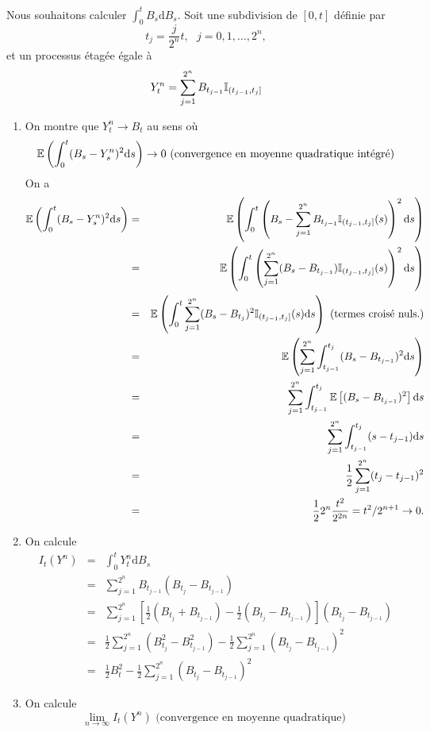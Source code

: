 \begin{ex}
Nous souhaitons calculer $\int_0^t B_s\text{d}B_s$. Soit une subdivision de $[0,t]$ définie par 
$$
t_j = \frac{j}{2^n}t,\text{ }j =0, 1,\ldots, 2^n,
$$
et un processus étagée égale à 
$$
Y_t^n = \sum_{j = 1}^{2^n}B_{t_{j-1}}\mathbb{I}_{(t_{j-1}, t_j]}
$$
\begin{enumerate}
\item On montre que $Y_t^n\rightarrow B_t$ au sens où
$$
\mathbb{E}\left(\int_0^t(B_s- Y_s^n)^2\text{d}s\right)\rightarrow0 \text{ (convergence en moyenne quadratique intégré)}
$$
On a 
\begin{eqnarray*}
\mathbb{E}\left(\int_0^t(B_s- Y_s^n)^2\text{d}s\right)&=&
\mathbb{E}\left(\int_0^t \left(B_s- \sum_{j=1}^{2^n}B_{t_{j-1}}\mathbb{I}_{(t_{j-1}, t_{j}]}(s)\right)^2\text{d}s\right)\\
&=&\mathbb{E}\left(\int_0^t \left( \sum_{j=1}^{2^n}(B_s-B_{t_{j-1}})\mathbb{I}_{(t_{j-1}, t_{j}]}(s)\right)^2\text{d}s\right)\\
&=&\mathbb{E}\left(\int_0^t \sum_{j=1}^{2^n}(B_s-B_{t_j})^2\mathbb{I}_{(t_{j-1}, t_{j}]}(s)\text{d}s\right) \text{ (termes croisé nuls.)}\\
&=&\mathbb{E}\left( \sum_{j=1}^{2^n}\int_{t_{j-1}}^{t_{j}}(B_s-B_{t_{j-1}})^2\text{d}s\right)\\
&=&\sum_{j=1}^{2^n}\int_{t_{j-1}}^{t_{j}}\mathbb{E}\left[(B_s-B_{t_{j-1}})^2\right]\text{d}s\\
&=&\sum_{j=1}^{2^n}\int_{t_{j-1}}^{t_{j}}(s-t_{j-1})\text{d}s\\
&=&\frac{1}{2}\sum_{j=1}^{2^n}(t_{j}-t_{j-1})^2\\
&=&\frac{1}{2}2^n\frac{t^2}{2^{2n}} = t^2/ 2^{n+1}\rightarrow 0.
\end{eqnarray*}
\item On calcule 
\begin{eqnarray*}
I_t(Y^n) &=& \int_0^tY^n_t\text{d}B_s\\
&=& \sum_{j =1}^{2^n}B_{t_{j-1}}(B_{t_j}- B_{t_{j-1}})\\
&=& \sum_{j =1}^{2^n}\left[\frac{1}{2}(B_{t_j} + B_{t_{j-1}})- \frac{1}{2}(B_{t_j}- B_{t_{j-1}})\right](B_{t_j}- B_{t_{j-1}})\\
&=&\frac{1}{2}\sum_{j =1}^{2^n}(B_{t_j}^2 - B_{t_{j-1}}^2) - \frac{1}{2}\sum_{j =1}^{2^n}(B_{t_j}- B_{t_{j-1}})^2\\
&=& \frac{1}{2}B_t^2 - \frac{1}{2}\sum_{j =1}^{2^n}(B_{t_j}- B_{t_{j-1}})^2
\end{eqnarray*}
\item On calcule 
$$
\underset{n\rightarrow \infty}{\lim} I_t(Y^n)\text{ (convergence en moyenne quadratique) }
$$
\end{enumerate}
\end{ex}

